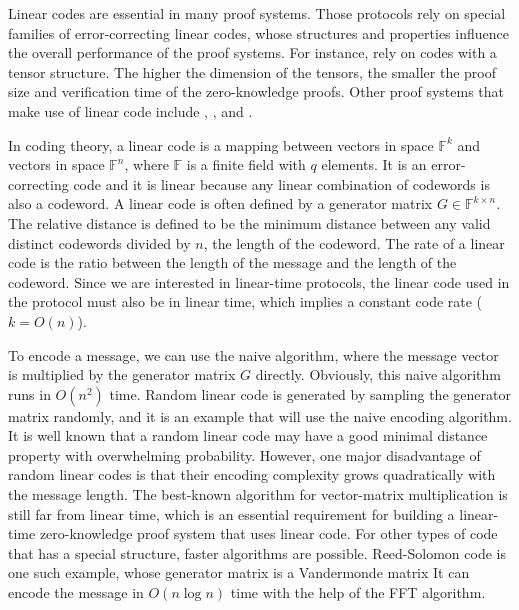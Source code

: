 Linear codes are essential in many proof systems. Those protocols rely on special families of error-correcting linear codes, whose structures and properties influence the overall performance of the proof systems. For instance, \cite{brakedown} \cite{cryptoeprint:2020/1426} \cite{BCL22} rely on codes with a tensor structure. The higher the dimension of the tensors, the smaller the proof size and verification time of the zero-knowledge proofs. Other proof systems that make use of linear code include \cite{DBLP:conf/coco/BordageLNR22}, \cite{DBLP:conf/icalp/Ben-SassonBHR18}, \cite{DBLP:conf/ccs/AmesHIV17} and \cite{DBLP:conf/crypto/Ben-SassonBHR19}.


In coding theory, a linear code is a mapping between vectors in space $\mathbb{F}^k$ and vectors in space $\mathbb{F}^n$, where $\mathbb{F}$ is a finite field with $q$ elements. It is an error-correcting code and it is linear because any linear combination of codewords is also a codeword. A linear code is often defined by a generator matrix $G \in \mathbb{F}^{k \times n}$. The relative distance is defined to be the minimum distance between any valid distinct codewords divided by $n$, the length of the codeword. The rate of a linear code is the ratio between the length of the message and the length of the codeword. Since we are interested in linear-time protocols, the linear code used in the protocol must also be in linear time, which implies a constant code rate ($k = O(n)$).

To encode a message, we can use the naive algorithm, where the message vector is multiplied by the generator matrix $G$ directly. Obviously, this naive algorithm runs in $O(n^2)$ time. 
Random linear code is generated by sampling the generator matrix randomly, and it is an example that will use the naive encoding algorithm. It is well known that a random linear code may have a good minimal distance property with overwhelming probability. However, one major disadvantage of random linear codes is that their encoding complexity grows quadratically with the message length. The best-known algorithm for vector-matrix multiplication is still far from linear time, which is an essential requirement for building a linear-time zero-knowledge proof system that uses linear code. For other types of code that has a special structure, faster algorithms are possible. Reed-Solomon code is one such example, whose generator matrix is a Vandermonde matrix It can encode the message in $O(n \log n)$ time with the help of the FFT algorithm.



